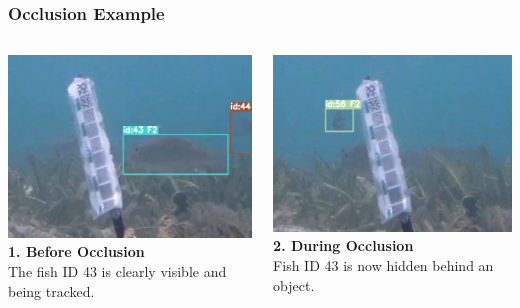 \documentclass[serif]{beamer}  %
\begin{document}
\begin{frame}
    \frametitle{Occlusion Example}
    
    \begin{columns}[T,totalwidth=\textwidth] 
        \begin{column}{0.32\textwidth}
            \centering
            \includegraphics[width=\linewidth]{images/occlusion_1.png}
            \vspace{0.5em}
            \tiny
            \textbf{1. Before Occlusion} \\
            The fish ID 43 is clearly visible and being tracked.
        \end{column}
        
        \begin{column}{0.32\textwidth}
            \centering
            \includegraphics[width=\linewidth]{images/occlusion_2.png}
            \vspace{0.5em}
            \tiny
            \textbf{2. During Occlusion} \\
            Fish ID 43 is now hidden behind an object.
        \end{column}
        

\end{columns}
\end{frame}
\end{document}
